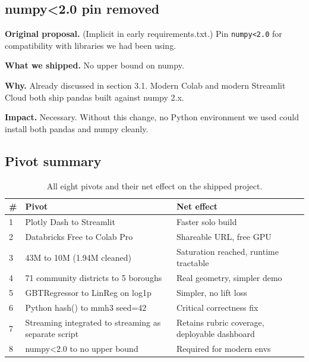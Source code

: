 \documentclass[11pt,letterpaper]{article}
\begin{document}
\subsection{numpy<2.0 pin removed}

\textbf{Original proposal.} (Implicit in early requirements.txt.) Pin \texttt{numpy<2.0} for compatibility with libraries we had been using.

\textbf{What we shipped.} No upper bound on numpy.

\textbf{Why.} Already discussed in section 3.1. Modern Colab and modern Streamlit Cloud both ship pandas built against numpy 2.x.

\textbf{Impact.} Necessary. Without this change, no Python environment we used could install both pandas and numpy cleanly.

\subsection{Pivot summary}

\begin{table}[h]
\centering
\small
\begin{tabular}{lll}
\toprule
\textbf{\#} & \textbf{Pivot} & \textbf{Net effect} \\
\midrule
1 & Plotly Dash to Streamlit & Faster solo build \\
2 & Databricks Free to Colab Pro & Shareable URL, free GPU \\
3 & 43M to 10M (1.94M cleaned) & Saturation reached, runtime tractable \\
4 & 71 community districts to 5 boroughs & Real geometry, simpler demo \\
5 & GBTRegressor to LinReg on log1p & Simpler, no lift loss \\
6 & Python hash() to mmh3 seed=42 & Critical correctness fix \\
7 & Streaming integrated to streaming as separate script & Retains rubric coverage, deployable dashboard \\
8 & numpy<2.0 to no upper bound & Required for modern envs \\
\bottomrule
\end{tabular}
\caption{All eight pivots and their net effect on the shipped project.}
\end{table}

\newpage
\end{document}
